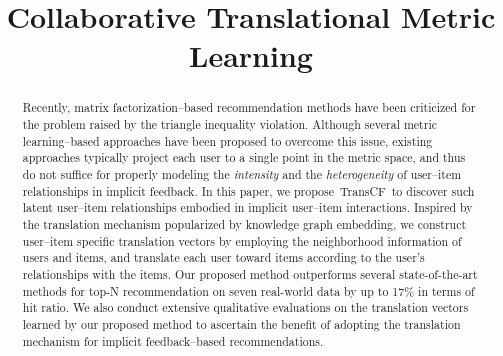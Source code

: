 \documentclass[conference]{IEEEtran}
\newcommand{\propose}{\textsf{{TransCF}}}
\begin{document}
\title{Collaborative Translational Metric Learning}

\author{
}

\maketitle

\begin{abstract}
Recently, matrix factorization--based recommendation methods have been criticized for the problem raised by the triangle inequality violation.
Although several metric learning--based approaches have been proposed to overcome this issue, existing approaches typically project each user to a single point in the metric space, and thus do not suffice for properly modeling the \textit{intensity} and the \textit{heterogeneity} of user--item relationships in implicit feedback. In this paper, we propose~\propose~to discover such latent user--item relationships embodied in implicit user--item interactions. Inspired by the translation mechanism popularized by knowledge graph embedding, we construct user--item specific translation vectors by employing the neighborhood information of users and items, and translate each user toward items according to the user's relationships with the items. Our proposed method outperforms several state-of-the-art methods for top-N recommendation on seven real-world data by up to 17\% in terms of hit ratio. We also conduct extensive qualitative evaluations on the translation vectors learned by our proposed method to ascertain the benefit of adopting the translation mechanism for implicit feedback--based recommendations.
\end{abstract}
\end{document}
